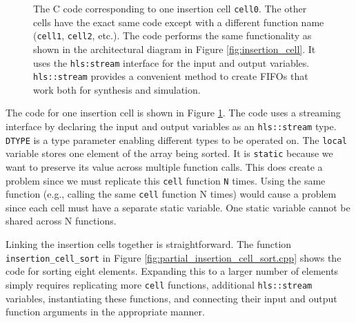 \begin{figure}

\caption{  The \VHLS C code corresponding to one insertion cell \lstinline{cell0}. The other cells have the exact same code except with a different function name (\lstinline{cell1}, \lstinline{cell2}, etc.). The code performs the same functionality as shown in the architectural diagram in Figure \ref{fig:insertion_cell}. It uses the \lstinline{hls:stream} interface for the input and output variables. \lstinline{hls::stream} provides a convenient method to create FIFOs that work both for synthesis and simulation. }
\label{fig:insertion_cell_sort.cpp}
\end{figure}

The code for one insertion cell is shown in Figure \ref{fig:insertion_cell_sort.cpp}. The code uses a streaming interface by declaring the input and output variables as an \lstinline{hls::stream} type. \lstinline{DTYPE} is a type parameter enabling different types to be operated on. The \lstinline{local} variable stores one element of the array being sorted. It is \lstinline{static} because we want to preserve its value across multiple function calls. This does create a problem since we must replicate this \lstinline{cell} function \lstinline{N} times.  Using the same function (e.g., calling the same \lstinline{cell} function N times) would cause a problem since each cell must have a separate static variable.  One static variable cannot be shared across N functions.

%


Linking the insertion cells together is straightforward. The function \lstinline{insertion_cell_sort} in Figure \ref{fig:partial_insertion_cell_sort.cpp} shows the code for sorting eight elements. Expanding this to a larger number of elements simply requires replicating more \lstinline{cell} functions, additional \lstinline{hls::stream} variables, instantiating these functions, and connecting their input and output function arguments in the appropriate manner.

